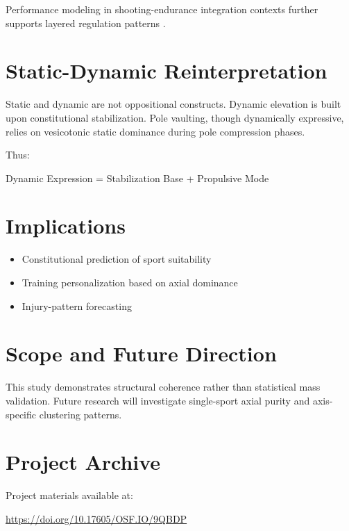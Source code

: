 \documentclass[12pt]{article}
\begin{document}
Performance modeling in shooting-endurance integration contexts further supports layered regulation patterns \cite{leonelli2024_biathlon_bayesian}.

\section{Static-Dynamic Reinterpretation}

Static and dynamic are not oppositional constructs. 
Dynamic elevation is built upon constitutional stabilization. 
Pole vaulting, though dynamically expressive, relies on vesicotonic static dominance during pole compression phases.

Thus:

\begin{center}
Dynamic Expression = Stabilization Base + Propulsive Mode
\end{center}

\section{Implications}

\begin{itemize}
\item Constitutional prediction of sport suitability
\item Training personalization based on axial dominance
\item Injury-pattern forecasting
\end{itemize}

\section{Scope and Future Direction}

This study demonstrates structural coherence rather than statistical mass validation. 
Future research will investigate single-sport axial purity and axis-specific clustering patterns.

\section*{Project Archive}

Project materials available at:

\url{https://doi.org/10.17605/OSF.IO/9QBDP}



\end{document}
